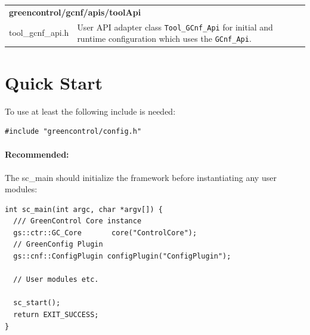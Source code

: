 \vspace{1 cm}



\noindent
\begin{minipage}{\textwidth}
\begin{tabularx}{\textwidth}{|l|X|}
	\cline{1-1}\cline{2-2}\multicolumn{2}{|l|}{  {\bf greencontrol/gcnf/apis/toolApi}    }\\
	\cline{1-1}\cline{2-2} tool\_gcnf\_api.h    &  User API adapter class \lstinline|Tool_GCnf_Api| for initial and runtime configuration which uses the \lstinline|GCnf_Api|.   \\
	\hline
\end{tabularx}
\end{minipage}


\section{Quick Start}

To use \GreenConfig at least the following include is needed:
\begin{lstlisting}
#include "greencontrol/config.h"
\end{lstlisting}

\noindent
\begin{minipage}{\textwidth}
\paragraph{Recommended:} The {\sffamily sc\_main} should initialize the framework before instantiating any user modules:
\begin{lstlisting}
int sc_main(int argc, char *argv[]) {
  /// GreenControl Core instance
  gs::ctr::GC_Core       core("ControlCore");
  // GreenConfig Plugin
  gs::cnf::ConfigPlugin configPlugin("ConfigPlugin");

  // User modules etc.

  sc_start();
  return EXIT_SUCCESS;
}
\end{lstlisting}
\end{minipage}

